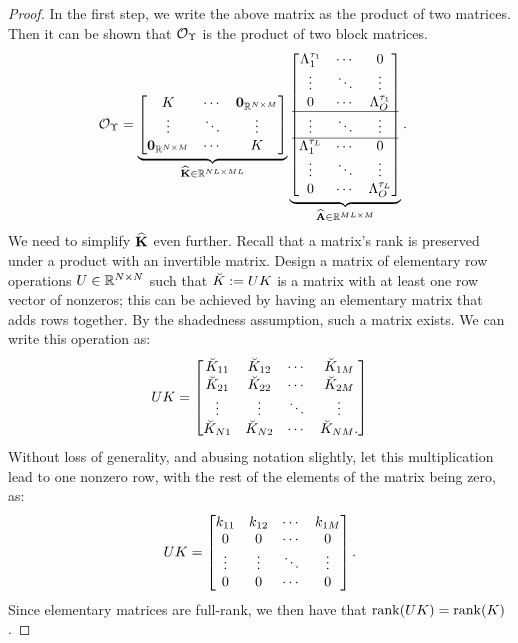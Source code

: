 \begin{proof}
	In the first step, we write the above matrix as the product of two matrices. Then it can be	shown that $\mathcal{O}_{\Upsilon}$ is the product of two block matrices.
	\begin{align*}
	\mathcal{O}_{\Upsilon}  
	&=
	\underbrace{
		\begin{bmatrix}
		K   & \cdots & \mathbf{0}_{\mathbb{R}^{N\times M}}\\
		\vdots  & \ddots & \vdots\\
		\mathbf{0}_{\mathbb{R}^{N\times M}}  & \cdots & K
		\end{bmatrix}}_{\widehat{\mathbf{K}}\in\mathbb{R}^{NL\times ML}}
	\underbrace{
		\begin{bmatrix}
		\Lambda_1^{\tau_1} & \cdots & 0\\
		\vdots & \ddots & \vdots\\
		0 & \cdots & \Lambda_{O}^{\tau_1}\\ 
		\hline
		\vdots & \ddots & \vdots\\
		\hline
		\Lambda_1^{\tau_{L}} & \cdots & 0\\
		\vdots & \ddots & \vdots\\
		0 & \cdots & \Lambda_{O}^{\tau_L}   
		\end{bmatrix}}_{\widehat{\mathbf{A}}\in\mathbb{R}^{ML\times M}}.
	\end{align*}
	We need to simplify $\widehat{\mathbf{K}}$ even further. 
	Recall that a matrix's rank is preserved under a product with an invertible matrix. Design a 
	matrix of elementary row operations $U\in\mathbb{R}^{N\times N}$ such that $\breve{K} := UK$ is a matrix with at least one row vector of nonzeros; this can be achieved by having an elementary matrix that adds rows together. By the shadedness assumption, such a matrix exists. We can write this operation as:
	\begin{align*}
	UK = 
	\begin{bmatrix}
	\breve{K}_{11} & \breve{K}_{12} & \cdots & \breve{K}_{1M}\\
	\breve{K}_{21} & \breve{K}_{22} & \cdots & \breve{K}_{2M}\\
	\vdots & \vdots & \ddots & \vdots\\
	\breve{K}_{N1} & \breve{K}_{N2} & \cdots & \breve{K}_{NM}.
	\end{bmatrix}
	\end{align*}
	Without loss of generality, and abusing notation slightly, let this multiplication lead to one nonzero row, with the rest of the elements of the matrix being zero, as:
	\begin{align*}
	UK = 
	\begin{bmatrix}
	k_{11} & k_{12} & \cdots & k_{1M}\\
	0 & 0 & \cdots & 0\\
	\vdots & \vdots & \ddots & \vdots\\
	0 & 0 & \cdots & 0
	\end{bmatrix}.
	\end{align*}
	Since elementary matrices are full-rank, we then have that $\operatorname{rank}(UK) = \operatorname{rank}(K)$. 
	

\end{proof}
